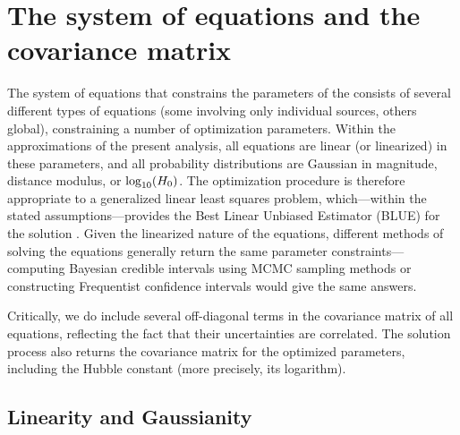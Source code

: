 \section{The system of equations and the covariance matrix}
\label{app:equations}

The system of equations that constrains the parameters of the {\DN} consists of several different types of equations (some involving only individual sources, others global), constraining a number of optimization parameters. Within the approximations of the present analysis, all equations are linear (or linearized) in these parameters, and all probability distributions are Gaussian in magnitude, distance modulus, or $ \log_{10}(H_0) $. The optimization procedure is therefore appropriate to a generalized linear least squares problem, which---within the stated assumptions---provides the Best Linear Unbiased Estimator (BLUE) for the solution \citep{aitken1935}. Given the linearized nature of the equations, different methods of solving the equations generally return the same parameter constraints---computing Bayesian credible intervals using MCMC sampling methods or constructing Frequentist confidence intervals would give the same answers.

Critically, we do include several off-diagonal terms in the covariance matrix of all equations, reflecting the fact that their uncertainties are correlated. The solution process also returns the covariance matrix for the optimized parameters, including the Hubble constant (more precisely, its logarithm).

\subsection {Linearity and Gaussianity}


